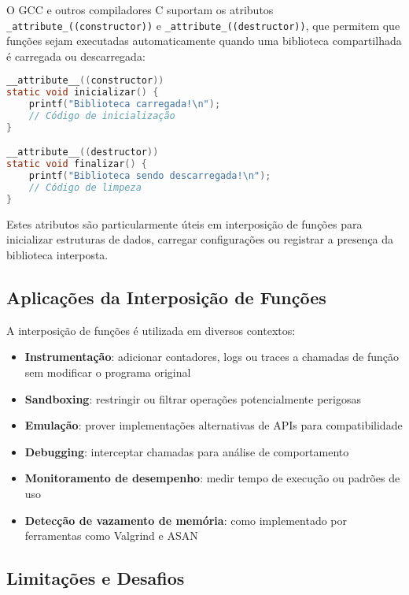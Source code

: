 O GCC e outros compiladores C suportam os atributos \texttt{_attribute_((constructor))} e \texttt{_attribute_((destructor))}, que permitem que funções sejam executadas automaticamente quando uma biblioteca compartilhada é carregada ou descarregada:

\begin{lstlisting}[language=C, caption={Uso de construtor e destrutor em biblioteca compartilhada}]
__attribute__((constructor))
static void inicializar() {
    printf("Biblioteca carregada!\n");
    // Código de inicialização
}

__attribute__((destructor))
static void finalizar() {
    printf("Biblioteca sendo descarregada!\n");
    // Código de limpeza
}
\end{lstlisting}

Estes atributos são particularmente úteis em interposição de funções para inicializar estruturas de dados, carregar configurações ou registrar a presença da biblioteca interposta.

\subsection{Aplicações da Interposição de Funções}

A interposição de funções é utilizada em diversos contextos:

\begin{itemize}
    \item \textbf{Instrumentação}: adicionar contadores, logs ou traces a chamadas de função sem modificar o programa original
    \item \textbf{Sandboxing}: restringir ou filtrar operações potencialmente perigosas
    \item \textbf{Emulação}: prover implementações alternativas de APIs para compatibilidade
    \item \textbf{Debugging}: interceptar chamadas para análise de comportamento
    \item \textbf{Monitoramento de desempenho}: medir tempo de execução ou padrões de uso
    \item \textbf{Detecção de vazamento de memória}: como implementado por ferramentas como Valgrind e ASAN
\end{itemize}

\subsection{Limitações e Desafios}

